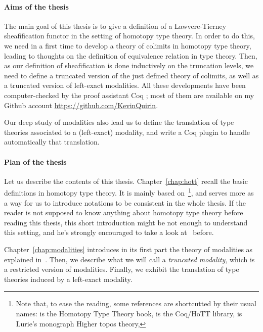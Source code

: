 
\paragraph*{Aims of the thesis} The main goal of this thesis is to
give a definition of a Lawvere-Tierney sheafification functor in the
setting of homotopy type theory. In order to do this, we need in a
first time to develop a theory of colimits in homotopy type theory,
leading to thoughts on the definition of equivalence relation in type
theory. Then, as our definition of sheafification is done inductively
on the truncation levels, we need to define a truncated version of the
just defined theory of colimits, as well as a truncated version of
left-exact modalities.  All these developments have been
computer-checked by the proof assistant Coq ; most of them are
available on my Github account \url{https://github.com/KevinQuirin}.

Our deep study of modalities also lead us to
define the translation of type
theories associated to a (left-exact) modality, and write a Coq plugin
to handle automatically that translation.


\paragraph*{Plan of the thesis}

Let us describe the contents of this thesis. Chapter~\ref{chap:hott}
recall the basic definitions in homotopy type theory. It is mainly
based on~\cite{hottbook}\footnote{Note that, to ease the reading, some
references are shortcutted by their usual names: \cite{hottbook} is
the Homotopy Type Theory book, \cite{hottlib} is the Coq/HoTT library,
\cite{lurie} is Lurie's monograph Higher topos theory, \etc}, and
serves more as a way for us to introduce notations to be consistent in
the whole thesis. If the reader is not supposed to know anything about
homotopy type theory before reading this thesis, this short
introduction might be not enough to understand this setting, and he's
strongly encouraged to take a look at~\cite{hottbook} before.

Chapter~\ref{chap:modalities} introduces in its first part the theory
of modalities as explained in~\cite{hottbook}. Then, we describe what
we will call a {\em truncated modality}, which is a restricted version
of modalities. Finally, we exhibit the translation of type theories
induced by a left-exact modality.

